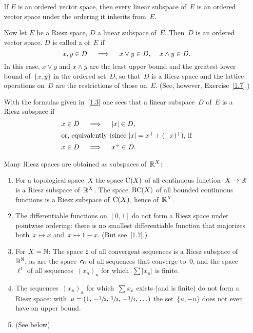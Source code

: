 \documentclass[main.tex]{subfiles}
\begin{document}
%
%
\begin{psec}[Intermezzo]
If $E$ is an ordered vector space, 
then every linear subspace of~$E$ is an ordered vector space
under the ordering it inherits from~$E$.

Now let $E$ be a Riesz space,
$D$ a linear subspace of~$E$.
Then~$D$ is an ordered vector space.
$D$ is called a  of~$E$
if
\begin{equation*}
x,y\in D \quad \implies \quad x\vee y\in D\textnormal{, }\quad x\wedge y\in D
\textnormal{.}
\end{equation*}
In this case,
$x\vee y$ and $x\wedge y$ are the least upper bound
and the greatest lower bound of~$\{x,y\}$ in the ordered set~$D$,
so that~$D$ is a Riesz space and the lattice operations on~$D$
are the restrictions of those on~$E$.
(See, however, Exercise~\ref{1.7}.)

With the formulas given in~\ref{1.3} one sees
that a linear subspace~$D$ of~$E$ is a Riesz subspace if
\begin{align*}
x\in D\quad &\implies \quad |x|\in D
\htam{,} \\ 
\intertext{%
or, 
equivalently
(since $|x|=x^+ + (-x)^+$), if}
x\in D \quad &\implies \quad x^+ \in D
\htam{.}
\end{align*}
\end{psec}
%
%
\begin{psec}[``1.5 continued'']
\label{1.5_2}
Many Riesz spaces are obtained as subspaces of~$\mathbb{R}^X$:
\begin{enumerate}
\item
\label{1.5-3}
For a topological space~$X$ the space $\mathrm{C}(X)$
of all continuous function~$X\rightarrow\mathbb{R}$ is a Riesz subspace of~$\mathbb{R}^X$.
The space~$\mathrm{BC}(X)$ of all bounded continuous functions 
is a Riesz subspace of~$\mathrm{C}(X)$,
hence of~$\mathbb{R}^X$.
%
\item
\label{1.5-4}
The differentiable functions on~$[0,1]$ 
do not form a Riesz space
under pointwise ordering:
there is no smallest differentiable function
that majorizes both~$x\mapsto x$ and~$x\mapsto 1-x$.
(But see~\ref{1.7}.)
%
\item
\label{1.5-5}
For $X=\mathbb{N}$: 
The space $\mathsf{c}$ of all convergent sequences 
is a Riesz subspace of~$\mathbb{R}^{\mathbb{N}}$,
as are the space~$\mathsf{c}_0$
of all sequences that converge to~$0$,
and the space~$\ell^1$
of all sequences~$(x_n)_n$
for which~$\sum|x_n|$ is finite.
%
\item
\label{1.5-6}
The sequences~$(x_n)_n$ for which~$\sum x_n$ exists (and is finite)
do not form a Riesz space:
with~$u=(1,\,-\sfrac{1}{2},\, \sfrac{1}{3},\, -\sfrac{1}{4},\, \ldots)$
the set~$\{u,-u\}$
does not even have an upper bound.
%
\item
(See below)
\end{enumerate}
\end{psec}
\end{document}
